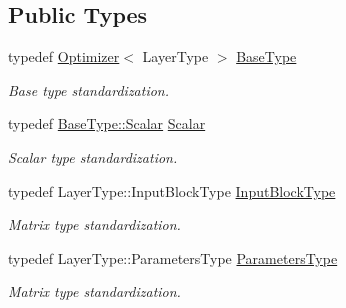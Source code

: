 \subsection*{Public Types}
\begin{DoxyCompactItemize}
\item 
typedef \hyperlink{classffnn_1_1optimizer_1_1_optimizer}{Optimizer}$<$ Layer\-Type $>$ \hyperlink{classffnn_1_1optimizer_1_1_gradient_descent___a0d078c334d4cdebc587ac45ceb16cf8c}{Base\-Type}
\begin{DoxyCompactList}\small\item\em Base type standardization. \end{DoxyCompactList}\item 
typedef \hyperlink{classffnn_1_1optimizer_1_1_optimizer_acaa42e2661559c561caf881c4d934b8c}{Base\-Type\-::\-Scalar} \hyperlink{classffnn_1_1optimizer_1_1_gradient_descent___a9ea42179033176eb7686e00769034c8a}{Scalar}
\begin{DoxyCompactList}\small\item\em Scalar type standardization. \end{DoxyCompactList}\item 
typedef Layer\-Type\-::\-Input\-Block\-Type \hyperlink{classffnn_1_1optimizer_1_1_gradient_descent___a4870280152e25bf9a7622d52fa889b06}{Input\-Block\-Type}
\begin{DoxyCompactList}\small\item\em Matrix type standardization. \end{DoxyCompactList}\item 
typedef Layer\-Type\-::\-Parameters\-Type \hyperlink{classffnn_1_1optimizer_1_1_gradient_descent___ae5ad0804c042e40a0a0ac64ae34fdc85}{Parameters\-Type}
\begin{DoxyCompactList}\small\item\em Matrix type standardization. \end{DoxyCompactList}\end{DoxyCompactItemize}
